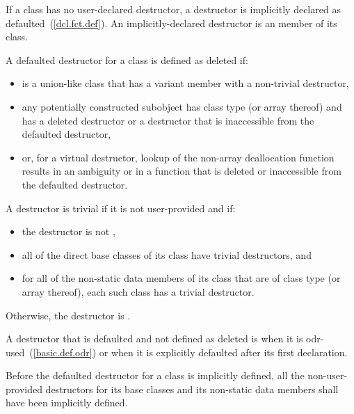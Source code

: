 \pnum
{}%
%
%
If a class has no user-declared
destructor, a destructor is implicitly
declared as defaulted~(\ref{dcl.fct.def}).
An implicitly-declared destructor is an
member of its class.

\pnum
A defaulted destructor for a class
   is defined as deleted if:
\begin{itemize}
\item {} is a union-like class that has a variant
  member with a non-trivial destructor,

\item any potentially constructed subobject has class type
   (or array thereof) and
   has a deleted destructor or a destructor
  that is inaccessible from the defaulted destructor,

\item or, for a virtual destructor, lookup of the non-array deallocation
  function results in an ambiguity or in a function that is deleted or
  inaccessible from the defaulted destructor.
\end{itemize}

\pnum
A destructor is trivial if it is not user-provided and if:

\begin{itemize}
\item the destructor is not ,

\item all of the direct base classes of its class have trivial destructors, and

\item for all of the non-static data members of its class that are of class
type (or array thereof), each such class has a trivial destructor.
\end{itemize}

Otherwise, the destructor is
.

\pnum
{}%
A destructor
that is defaulted and not defined as deleted
is
when it is odr-used~(\ref{basic.def.odr})
or when it is explicitly defaulted after its first declaration.

\pnum
Before the
defaulted destructor for a class is implicitly defined, all the non-user-provided
destructors for its base classes and its non-static data members shall have been
implicitly defined.

